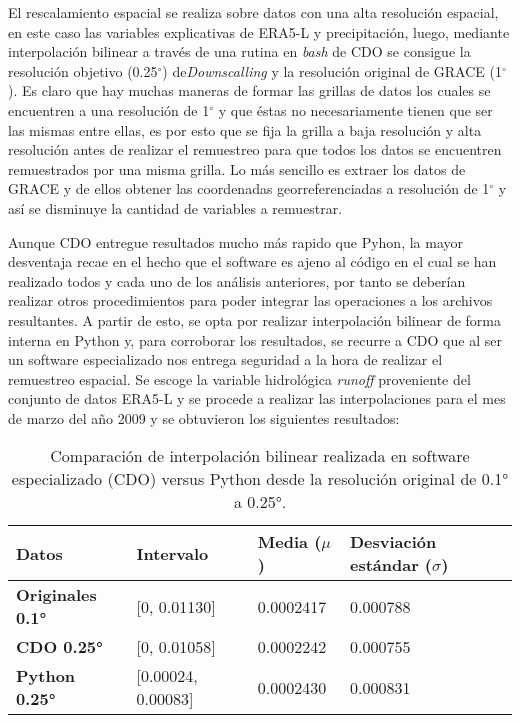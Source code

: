     
    El rescalamiento espacial se realiza sobre datos con una alta resolución espacial, en este caso las variables explicativas de ERA5-L y precipitación, luego, mediante interpolación bilinear a través de una rutina en \textit{bash} de CDO se consigue
    la resolución objetivo (0.25$^\circ$) de\textit{Downscalling} y la resolución original de GRACE (1$^\circ$). Es claro que hay muchas maneras de formar las grillas de datos los cuales se encuentren a una resolución de 
    1$^\circ$ y que éstas no necesariamente tienen que ser las mismas entre ellas, es por esto que se fija la grilla a baja resolución y alta resolución antes de realizar el remuestreo
    para que todos los datos se encuentren remuestrados por una misma grilla. Lo más sencillo es extraer los datos de GRACE y de ellos obtener las coordenadas georreferenciadas a resolución de 1$^\circ$ y así se disminuye la cantidad de
    variables a remuestrar.

    Aunque CDO entregue resultados mucho más rapido que Pyhon, la mayor desventaja recae en el hecho que el software es ajeno al código en el cual se han realizado todos y cada uno de los análisis anteriores, por tanto se deberían realizar otros procedimientos para poder integrar las operaciones a los archivos resultantes.
    A partir de esto, se opta por realizar interpolación bilinear de forma interna en Python y, para corroborar los resultados, se recurre a CDO que al ser un software especializado nos entrega seguridad a la hora de realizar el remuestreo
    espacial. Se escoge la variable hidrológica \textit{runoff} proveniente del conjunto de datos ERA5-L y se procede a realizar las interpolaciones para el mes de marzo del año 2009 y se obtuvieron los siguientes resultados:
    
    \begin{table}[H] 
        \caption[Comparación de interpolaciones Python/CDO]{Comparación de interpolación bilinear realizada en software especializado (CDO) versus Python desde la resolución original de 0.1° a 0.25°.}
        \begin{tabularx}{0.9\textwidth }{CCCC}
        \toprule
         \textbf{Datos}& \textbf{Intervalo}	&\textbf{Media ($\mu$)}  &\textbf{Desviación estándar ($\sigma$)}\\
            \midrule
            \textbf{Originales 0.1°}	&	[0, 0.01130]       &  0.0002417  & 0.000788\\
            \textbf{CDO 0.25°}	        &   [0, 0.01058]       &  0.0002242  & 0.000755\\
            \textbf{Python 0.25°}       &   [0.00024, 0.00083] &  0.0002430  & 0.000831\\
            \bottomrule
        \end{tabularx}
    \end{table}

